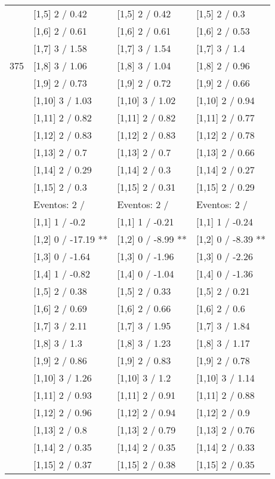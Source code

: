 \begin{table}
\begin{tabular}[t]{llll}
 & {}[1,5] 2  / 0.42 & {}[1,5] 2  / 0.42 & {}[1,5] 2  / 0.3\\
 & {}[1,6] 2  / 0.61 & {}[1,6] 2  / 0.61 & {}[1,6] 2  / 0.53\\
 & {}[1,7] 3  / 1.58 & {}[1,7] 3  / 1.54 & {}[1,7] 3  / 1.4\\
375 & {}[1,8] 3  / 1.06 & {}[1,8] 3  / 1.04 & {}[1,8] 2  / 0.96\\
\addlinespace
 & {}[1,9] 2  / 0.73 & {}[1,9] 2  / 0.72 & {}[1,9] 2  / 0.66\\
 & {}[1,10] 3  / 1.03 & {}[1,10] 3  / 1.02 & {}[1,10] 2  / 0.94\\
 & {}[1,11] 2  / 0.82 & {}[1,11] 2  / 0.82 & {}[1,11] 2  / 0.77\\
 & {}[1,12] 2  / 0.83 & {}[1,12] 2  / 0.83 & {}[1,12] 2  / 0.78\\
 & {}[1,13] 2  / 0.7 & {}[1,13] 2  / 0.7 & {}[1,13] 2  / 0.66\\
\addlinespace
 & {}[1,14] 2  / 0.29 & {}[1,14] 2  / 0.3 & {}[1,14] 2  / 0.27\\
 & {}[1,15] 2  / 0.3 & {}[1,15] 2  / 0.31 & {}[1,15] 2  / 0.29\\
 & Eventos:  2 / & Eventos:  2 / & Eventos:  2 /\\
 & {}[1,1] 1  / -0.2 & {}[1,1] 1  / -0.21 & {}[1,1] 1  / -0.24\\
 & {}[1,2] 0  / -17.19 ** & {}[1,2] 0  / -8.99 ** & {}[1,2] 0  / -8.39 **\\
\addlinespace
 & {}[1,3] 0  / -1.64 & {}[1,3] 0  / -1.96 & {}[1,3] 0  / -2.26\\
 & {}[1,4] 1  / -0.82 & {}[1,4] 0  / -1.04 & {}[1,4] 0  / -1.36\\
 & {}[1,5] 2  / 0.38 & {}[1,5] 2  / 0.33 & {}[1,5] 2  / 0.21\\
 & {}[1,6] 2  / 0.69 & {}[1,6] 2  / 0.66 & {}[1,6] 2  / 0.6\\
 & {}[1,7] 3  / 2.11 & {}[1,7] 3  / 1.95 & {}[1,7] 3  / 1.84\\
\addlinespace
500 & {}[1,8] 3  / 1.3 & {}[1,8] 3  / 1.23 & {}[1,8] 3  / 1.17\\
 & {}[1,9] 2  / 0.86 & {}[1,9] 2  / 0.83 & {}[1,9] 2  / 0.78\\
 & {}[1,10] 3  / 1.26 & {}[1,10] 3  / 1.2 & {}[1,10] 3  / 1.14\\
 & {}[1,11] 2  / 0.93 & {}[1,11] 2  / 0.91 & {}[1,11] 2  / 0.88\\
 & {}[1,12] 2  / 0.96 & {}[1,12] 2  / 0.94 & {}[1,12] 2  / 0.9\\
\addlinespace
 & {}[1,13] 2  / 0.8 & {}[1,13] 2  / 0.79 & {}[1,13] 2  / 0.76\\
 & {}[1,14] 2  / 0.35 & {}[1,14] 2  / 0.35 & {}[1,14] 2  / 0.33\\
 & {}[1,15] 2  / 0.37 & {}[1,15] 2  / 0.38 & {}[1,15] 2  / 0.35\\
\bottomrule
\end{tabular}
\end{table}
